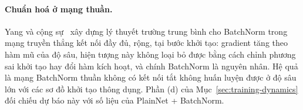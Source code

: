 {\paragraph{Chuẩn hoá ở mạng thuần.} Yang và cộng sự~\cite{Yang2019MeanField} xây dựng
lý thuyết trường trung bình cho BatchNorm trong mạng truyền thẳng kết nối đầy đủ, rộng,
tại bước khởi tạo: gradient tăng theo hàm mũ của độ sâu, hiện tượng này không loại
bỏ được bằng cách chỉnh phương sai khởi tạo hay đổi hàm kích hoạt, và chính BatchNorm là
nguyên nhân. Hệ quả là mạng BatchNorm thuần không có kết nối tắt không huấn luyện được ở
độ sâu lớn với các sơ đồ khởi tạo thông dụng. Phần (d) của Mục~\ref{sec:training-dynamics}
đối chiếu dự báo này với số liệu của PlainNet + BatchNorm.
}
